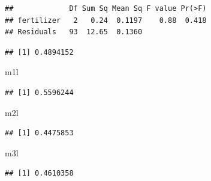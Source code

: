\documentclass[]{book}
\newenvironment{Shaded}{\begin{snugshade}}{\end{snugshade}}
\newcommand{\KeywordTok}[1]{\textcolor[rgb]{0.13,0.29,0.53}{\textbf{{#1}}}}
\newcommand{\DecValTok}[1]{\textcolor[rgb]{0.00,0.00,0.81}{{#1}}}
\newcommand{\StringTok}[1]{\textcolor[rgb]{0.31,0.60,0.02}{{#1}}}
\newcommand{\NormalTok}[1]{{#1}}
\begin{document}
\begin{verbatim}
##             Df Sum Sq Mean Sq F value Pr(>F)
## fertilizer   2   0.24  0.1197    0.88  0.418
## Residuals   93  12.65  0.1360
\end{verbatim}

\begin{Shaded}
\end{Shaded}

\begin{verbatim}
## [1] 0.4894152
\end{verbatim}

\begin{Shaded}
\begin{Highlighting}[]
\NormalTok{m1l}
\end{Highlighting}
\end{Shaded}

\begin{verbatim}
## [1] 0.5596244
\end{verbatim}

\begin{Shaded}
\begin{Highlighting}[]
\NormalTok{m2l}
\end{Highlighting}
\end{Shaded}

\begin{verbatim}
## [1] 0.4475853
\end{verbatim}

\begin{Shaded}
\begin{Highlighting}[]
\NormalTok{m3l}
\end{Highlighting}
\end{Shaded}

\begin{verbatim}
## [1] 0.4610358
\end{verbatim}
\end{document}
